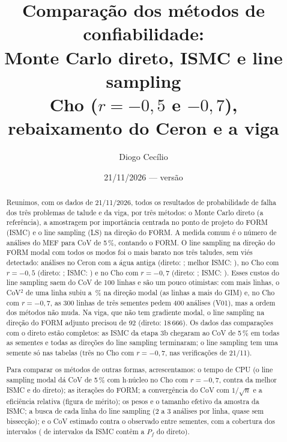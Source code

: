\documentclass[11pt,a4paper]{article}
\title{Comparação dos métodos de confiabilidade:\\ Monte Carlo direto, ISMC e line sampling\\
\large Cho ($r = -0{,}5$ e $-0{,}7$), rebaixamento do Ceron e a viga}
\author{Diogo Cecílio}
\date{21/11/2026 --- versão \versao}
\begin{document}
\maketitle
\begin{abstract}
Reunimos, com os dados de 21/11/2026, todos os resultados de probabilidade de falha dos três problemas de talude e da
viga, por três métodos: o Monte Carlo direto (a referência), a amostragem por importância centrada no ponto de projeto
do FORM (ISMC) e o line sampling (LS) na direção do FORM. A medida comum é o número de análises do MEF para CoV de 5\,\%,
contando o FORM. O line sampling na direção do FORM modal com todos os modos foi o mais barato nos três taludes, sem viés
detectado: \lsNCe{} análises no Ceron com a água antiga (direto: ; melhor ISMC: \ismcNCe), \lsNRa{} no Cho com $r = -0{,}5$ (direto:
; ISMC: \ismcNRa) e \lsNRb{} no Cho com $r = -0{,}7$ (direto: ; ISMC: \ismcNRb). Esses custos do line
sampling saem do CoV de 100 linhas e são um pouco otimistas: com mais linhas, o CoV$^2$ de uma linha subiu
\sglCovDoisGmMin{} a \sglCovDoisGmMax\,\% na direção modal (as linhas a mais do GIM) e, no Cho com $r = -0{,}7$, as 300
linhas de três sementes pedem 400 análises (V01), mas a ordem dos métodos não muda. Na viga, que não tem gradiente modal, o line
sampling na direção do FORM adjunto precisou de 92 (direto: 18\,666). Os dados das comparações com o direto estão completos: as
ISMC da etapa 3b chegaram ao CoV de 5\,\% em todas as sementes e todas as direções do line sampling terminaram; o line
sampling tem uma semente só nas tabelas (três no Cho com $r = -0{,}7$, nas verificações de 21/11).

Para comparar os métodos de outras formas, acrescentamos: o tempo de CPU (o line sampling modal dá CoV de 5\,\% com
\hLsRb{} h$\cdot$núcleo no Cho com $r = -0{,}7$, contra \hIsmcRb{} da melhor ISMC e \hDirRb{} do direto); as iterações
do FORM; a convergência do CoV com $1/\sqrt{n}$ e a eficiência relativa (figura de mérito); os pesos e o tamanho efetivo
da amostra da ISMC; a busca de cada linha do line sampling (2 a 3 análises por linha, quase sem bissecção); e o CoV
estimado contra o observado entre sementes, com a cobertura dos intervalos (\icDentro{} de \icTotal{} intervalos da
ISMC contêm a $P_f$ do direto).


\end{abstract}
\end{document}
